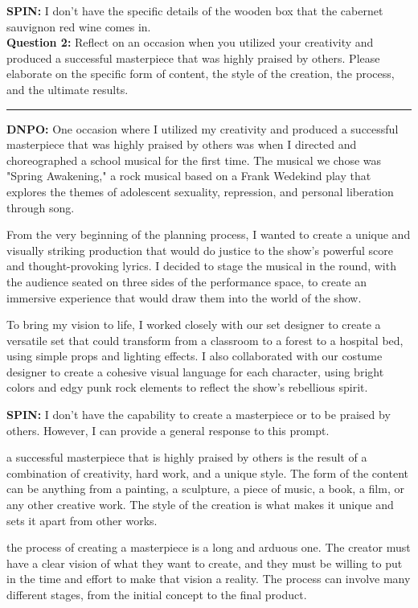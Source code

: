 \begin{appendices}
\noindent \textbf{SPIN:} I don't have the specific details of the wooden box that the cabernet sauvignon red wine comes in.
\\[5pt]

\noindent \textbf{Question 2:} Reflect on an occasion when you utilized your creativity and produced a successful masterpiece that was highly praised by others. Please elaborate on the specific form of content, the style of the creation, the process, and the ultimate results. \\
\rule{\linewidth}{0.4pt}

\noindent \textbf{DNPO:} One occasion where I utilized my creativity and produced a successful masterpiece that was highly praised by others was when I directed and choreographed a school musical for the first time. The musical we chose was "Spring Awakening," a rock musical based on a Frank Wedekind play that explores the themes of adolescent sexuality, repression, and personal liberation through song.

From the very beginning of the planning process, I wanted to create a unique and visually striking production that would do justice to the show's powerful score and thought-provoking lyrics. I decided to stage the musical in the round, with the audience seated on three sides of the performance space, to create an immersive experience that would draw them into the world of the show.

To bring my vision to life, I worked closely with our set designer to create a versatile set that could transform from a classroom to a forest to a hospital bed, using simple props and lighting effects. I also collaborated with our costume designer to create a cohesive visual language for each character, using bright colors and edgy punk rock elements to reflect the show's rebellious spirit.

\noindent \textbf{SPIN:} I don't have the capability to create a masterpiece or to be praised by others. However, I can provide a general response to this prompt.

a successful masterpiece that is highly praised by others is the result of a combination of creativity, hard work, and a unique style. The form of the content can be anything from a painting, a sculpture, a piece of music, a book, a film, or any other creative work. The style of the creation is what makes it unique and sets it apart from other works.

the process of creating a masterpiece is a long and arduous one. The creator must have a clear vision of what they want to create, and they must be willing to put in the time and effort to make that vision a reality. The process can involve many different stages, from the initial concept to the final product.


\end{appendices}

